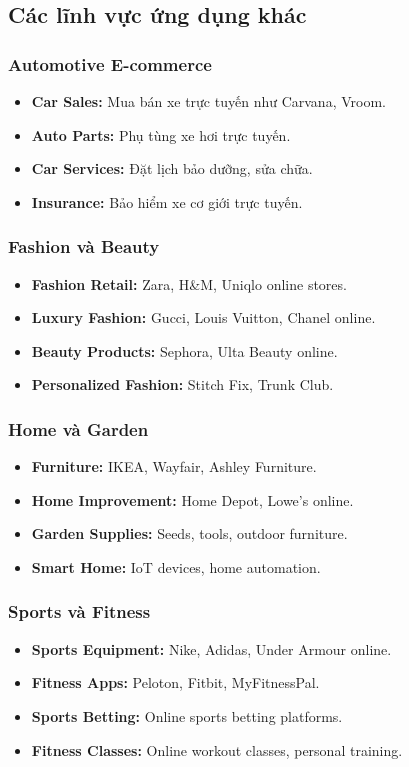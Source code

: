 \documentclass[a4paper,12pt]{report}
\begin{document}
\subsection{Các lĩnh vực ứng dụng khác}

\subsubsection{Automotive E-commerce}
\begin{itemize}
    \item \textbf{Car Sales:} Mua bán xe trực tuyến như Carvana, Vroom.
    \item \textbf{Auto Parts:} Phụ tùng xe hơi trực tuyến.
    \item \textbf{Car Services:} Đặt lịch bảo dưỡng, sửa chữa.
    \item \textbf{Insurance:} Bảo hiểm xe cơ giới trực tuyến.
\end{itemize}

\subsubsection{Fashion và Beauty}
\begin{itemize}
    \item \textbf{Fashion Retail:} Zara, H&M, Uniqlo online stores.
    \item \textbf{Luxury Fashion:} Gucci, Louis Vuitton, Chanel online.
    \item \textbf{Beauty Products:} Sephora, Ulta Beauty online.
    \item \textbf{Personalized Fashion:} Stitch Fix, Trunk Club.
\end{itemize}

\subsubsection{Home và Garden}
\begin{itemize}
    \item \textbf{Furniture:} IKEA, Wayfair, Ashley Furniture.
    \item \textbf{Home Improvement:} Home Depot, Lowe's online.
    \item \textbf{Garden Supplies:} Seeds, tools, outdoor furniture.
    \item \textbf{Smart Home:} IoT devices, home automation.
\end{itemize}

\subsubsection{Sports và Fitness}
\begin{itemize}
    \item \textbf{Sports Equipment:} Nike, Adidas, Under Armour online.
    \item \textbf{Fitness Apps:} Peloton, Fitbit, MyFitnessPal.
    \item \textbf{Sports Betting:} Online sports betting platforms.
    \item \textbf{Fitness Classes:} Online workout classes, personal training.
\end{itemize}
\end{document}
